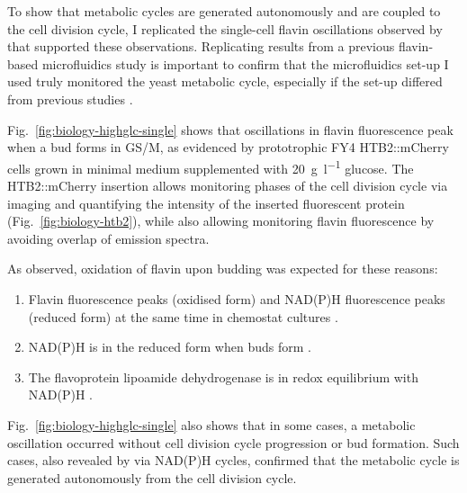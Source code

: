 To show that metabolic cycles are generated autonomously and are coupled to the cell division cycle, I replicated the single-cell flavin oscillations observed by \textcite{baumgartnerFlavinbasedMetabolicCycles2018} that supported these observations.
Replicating results from a previous flavin-based microfluidics study is important to confirm that the microfluidics set-up I used truly monitored the yeast metabolic cycle, especially if the set-up differed from previous studies \parencite{papagiannakisAutonomousMetabolicOscillations2017, baumgartnerFlavinbasedMetabolicCycles2018}.

Fig.\ \ref{fig:biology-highglc-single} shows that oscillations in flavin fluorescence peak when a bud forms in GS/M, as evidenced by prototrophic FY4 HTB2::mCherry cells grown in minimal medium supplemented with \SI{20}{\gram~\litre^{-1}} glucose.
The HTB2::mCherry insertion allows monitoring phases of the cell division cycle via imaging and quantifying the intensity of the inserted fluorescent protein (Fig.\ \ref{fig:biology-htb2}), while also allowing monitoring flavin fluorescence by avoiding overlap of emission spectra.

As observed, oxidation of flavin upon budding was expected for these reasons:
\begin{enumerate}
  \item Flavin fluorescence peaks (oxidised form) and NAD(P)H fluorescence peaks (reduced form) at the same time in chemostat cultures \parencite{murrayRedoxRegulationRespiring2011}.
  \item NAD(P)H is in the reduced form when buds form \parencite{papagiannakisAutonomousMetabolicOscillations2017}.
  \item The flavoprotein lipoamide dehydrogenase is in redox equilibrium with NAD(P)H \parencite{sianoNADHFlavinFluorescence1989}.
\end{enumerate}

Fig.\ \ref{fig:biology-highglc-single} also shows that in some cases, a metabolic oscillation occurred without cell division cycle progression or bud formation.
Such cases, also revealed by \textcite{papagiannakisAutonomousMetabolicOscillations2017} via NAD(P)H cycles, confirmed that the metabolic cycle is generated autonomously from the cell division cycle.


